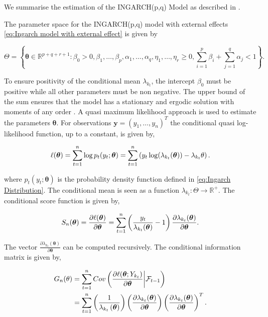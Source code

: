 We summarise the estimation of the INGARCH(p,q) Model as described in \cite{Liboschik:2016}.

The parameter space for the INGARCH(p,q) model with external effects \ref{eq:Ingarch model with external effect} is given by 

\begin{equation*}
\Theta = \left\{ \bm{\theta} \in \mathbb{R}^{p+q+r+1}: \beta_0 > 0, \beta_1,\ldots,\beta_p,\alpha_1,\ldots,\alpha_q,\eta_1,\ldots,\eta_r \geq 0, \sum_{i=1}^p\beta_i + \sum_{j=1}^q\alpha_j < 1 \right\}.
\label{eq:Ingarch parameter space}
\end{equation*}

To ensure positivity of the conditional mean $\lambda_{k_t}$, the intercept $\beta_0$ must be positive while all other parameters must be non negative. The upper bound of the sum ensures that the model has a stationary and ergodic solution with moments of any order \cite{Ferland:2006,Fokianos:2009,Doukhan:2012}. A quasi maximum likelihood approach is used to estimate the parameters $\bm{\theta}$. 
For observations $\textbf{y} = \left(y_1,\ldots,y_n\right)^T$ the conditional quasi log-likelihood function, up to a constant, is given by,

\begin{equation}
\ell(\bm{\theta}) = \sum_{t=1}^n\log p_t(y_t;\bm{\theta}) = \sum_{t=1}^n \left(y_t\log(\lambda_{k_t}(\bm{\theta})) - \lambda_{k_t}{\theta}\right).
\label{eq: Quasi log likelihood}
\end{equation}

where $p_t(y_t;\bm{\theta})$ is the probability density function defined in \ref{eq:Ingarch Distribution}. The conditional mean is seen as a function $\lambda_{k_t}: \Theta \rightarrow \mathbb{R}^{+}$. The conditional score function is given by,

\begin{equation}
S_n(\bm{\theta}) = \frac{\partial \ell(\bm{\theta})}{\partial \bm{\theta}} = \sum_{t=1}^n\left(\frac{y_t}{\lambda_{k_t}(\bm{\theta})}-1\right)\frac{\partial\lambda_{k_t}(\bm{\theta})}{\partial \bm{\theta}}.
\label{eq:conditional score}
\end{equation}

The vector $\frac{\partial\lambda_{k_t}(\bm{\theta})}{\partial \bm{\theta}}$ can be computed recursively. 
The conditional information matrix is given by, 

\begin{align*}
G_n(\theta) &= \sum_{t=1}^n Cov\left(\frac{\partial \ell(\bm{\theta}; Y_{k_t})}{\partial \bm{\theta}} \middle| \mathcal{F}_{t-1}\right) \\
&=  \sum_{t=1}^n \left(\frac{1}{\lambda_{k_t}\left(\bm{\theta}\right)}\right) \left(\frac{\partial \lambda_{k_t}(\bm{\theta})}{\partial \bm{\theta}}\right)\left(\frac{\partial \lambda_{k_t}(\bm{\theta})}{\partial \bm{\theta}}\right)^T.
\label{eq:conditional information matrix}
\end{align*}

